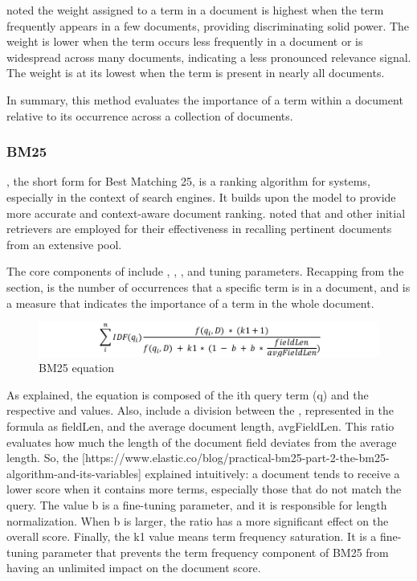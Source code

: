 \citet{manning_introduction_2009} noted the {\tfidf} weight assigned to a term in a document is highest when the term frequently appears in a few documents, providing discriminating solid power. The weight is lower when the term occurs less frequently in a document or is widespread across many documents, indicating a less pronounced relevance signal. The weight is at its lowest when the term is present in nearly all documents. 

In summary, this {\ir} method evaluates the importance of a term within a document relative to its occurrence across a collection of documents.


\subsubsection{BM25}

{\bm}, the short form for Best Matching 25, is a ranking algorithm for {\ir} systems, especially in the context of search engines. It builds upon the {\tfidf} model to provide more accurate and context-aware document ranking. \citet{hambarde_information_2023} noted that {\bm} and other initial retrievers are employed for their effectiveness in recalling pertinent documents from an extensive pool.

The core components of {\bm} include {\tf}, {\idf}, {\dl}, and tuning parameters. Recapping from the {\tfidf} section, {\tf} is the number of occurrences that a specific term is in a document, and {\idf} is a measure that indicates the importance of a term in the whole document. 

\begin{figure}[ht]
    \includegraphics[width=14cm]{figs/chapter2/bm25_equation.png}
    \centering
    \caption{BM25 equation}
\end{figure}

As \citet{phd_understanding_2023} explained, the {\bm} equation is composed of the ith query term (q) and the respective {\idf} and {\tf} values. Also, include a division between the {\dl}, represented in the formula as fieldLen, and the average document length, avgFieldLen. This ratio evaluates how much the length of the document field deviates from the average length. So, the [https://www.elastic.co/blog/practical-bm25-part-2-the-bm25-algorithm-and-its-variables] explained intuitively: a document tends to receive a lower score when it contains more terms, especially those that do not match the query. The value b is a fine-tuning parameter, and it is responsible for length normalization. When b is larger, the ratio has a more significant effect on the overall score. Finally, the k1 value means term frequency saturation. It is a fine-tuning parameter that prevents the term frequency component of BM25 from having an unlimited impact on the document score.

